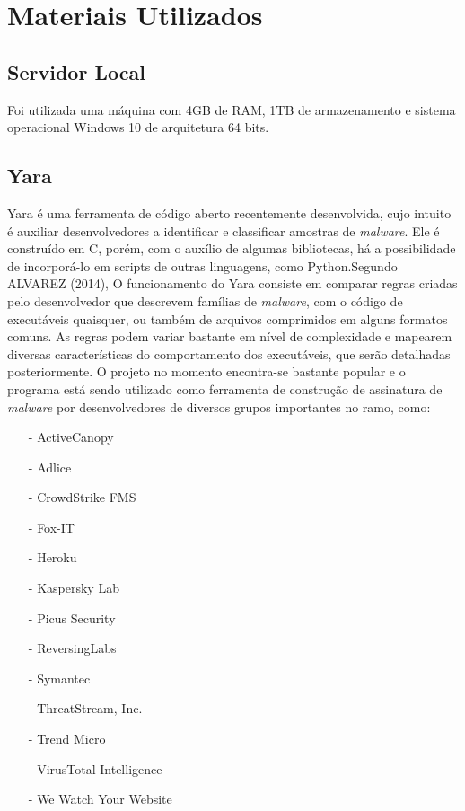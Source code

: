 \section{Materiais Utilizados}
\label{l.material}

\subsection{Servidor Local} %
\label{sub:servidor}

Foi utilizada uma máquina com 4GB de RAM, 1TB de armazenamento e sistema operacional Windows 10 de arquitetura 64 bits.

\subsection{Yara}
\label{sub:Yara}

Yara é uma ferramenta de código aberto recentemente desenvolvida, cujo intuito é auxiliar desenvolvedores a identificar e classificar amostras de \textit{malware}. Ele é construído em C, porém, com o auxílio de algumas bibliotecas, há a possibilidade de incorporá-lo em scripts de outras linguagens, como Python.Segundo ALVAREZ (2014), O funcionamento do Yara consiste em comparar regras criadas pelo desenvolvedor que descrevem famílias de \textit{malware}, com o código de executáveis quaisquer, ou também de arquivos comprimidos em alguns formatos comuns. As regras podem variar bastante em nível de complexidade e mapearem diversas características do comportamento dos executáveis, que serão detalhadas posteriormente. O projeto no momento encontra-se bastante popular e o programa está sendo utilizado como ferramenta de construção de assinatura de \textit{malware} por desenvolvedores de diversos grupos importantes no ramo, como:
\begin{itemize}
	\item[-] ActiveCanopy
	\item[-] Adlice
	\item[-] CrowdStrike FMS
	\item[-] Fox-IT
	\item[-] Heroku
	\item[-] Kaspersky Lab
	\item[-] Picus Security
	\item[-] ReversingLabs
	\item[-] Symantec
	\item[-] ThreatStream, Inc.
	\item[-] Trend Micro
	\item[-] VirusTotal Intelligence
	\item[-] We Watch Your Website
\end{itemize}

